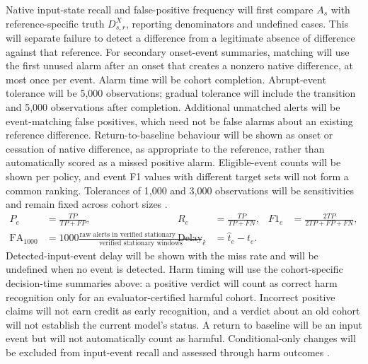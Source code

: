 Native input-state recall and false-positive frequency will first compare $A_s$ with reference-specific truth $D_{s,r}^X$, reporting denominators and undefined cases. This will separate failure to detect a difference from a legitimate absence of difference against that reference. For secondary onset-event summaries, matching will use the first unused alarm after an onset that creates a nonzero native difference, at most once per event. Alarm time will be cohort completion. Abrupt-event tolerance will be 5,000 observations; gradual tolerance will include the transition and 5,000 observations after completion. Additional unmatched alerts will be event-matching false positives, which need not be false alarms about an existing reference difference. Return-to-baseline behaviour will be shown as onset or cessation of native difference, as appropriate to the reference, rather than automatically scored as a missed positive alarm. Eligible-event counts will be shown per policy, and event F1 values with different target sets will not form a common ranking. Tolerances of 1,000 and 3,000 observations will be sensitivities and remain fixed across cohort sizes \cite{window,cerqueira}.
\begin{align}
P_e&=\frac{TP}{TP+FP},&R_e&=\frac{TP}{TP+FN},&F1_e&=\frac{2TP}{2TP+FP+FN},\\
\mathrm{FA}_{1000}&=1000\frac{\text{raw alerts in verified stationary windows}}{\text{verified stationary windows}},
&\mathrm{Delay}_e&=\widehat t_e-t_e.
\end{align}
Detected-input-event delay will be shown with the miss rate and will be undefined when no event is detected. Harm timing will use the cohort-specific decision-time summaries above: a positive verdict will count as correct harm recognition only for an evaluator-certified harmful cohort. Incorrect positive claims will not earn credit as early recognition, and a verdict about an old cohort will not establish the current model's status. A return to baseline will be an input event but will not automatically count as harmful. Conditional-only changes will be excluded from input-event recall and assessed through harm outcomes \cite{driftvis,cerqueira}.

